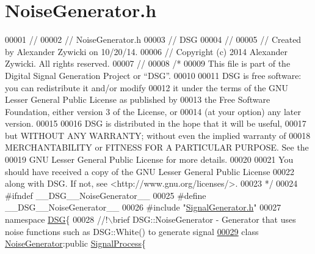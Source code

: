 \hypertarget{_noise_generator_8h_source}{\section{Noise\+Generator.\+h}
\label{_noise_generator_8h_source}
}

\begin{DoxyCode}
00001 \textcolor{comment}{//}
00002 \textcolor{comment}{//  NoiseGenerator.h}
00003 \textcolor{comment}{//  DSG}
00004 \textcolor{comment}{//}
00005 \textcolor{comment}{//  Created by Alexander Zywicki on 10/20/14.}
00006 \textcolor{comment}{//  Copyright (c) 2014 Alexander Zywicki. All rights reserved.}
00007 \textcolor{comment}{//}
00008 \textcolor{comment}{/*}
00009 \textcolor{comment}{ This file is part of the Digital Signal Generation Project or “DSG”.}
00010 \textcolor{comment}{}
00011 \textcolor{comment}{ DSG is free software: you can redistribute it and/or modify}
00012 \textcolor{comment}{ it under the terms of the GNU Lesser General Public License as published by}
00013 \textcolor{comment}{ the Free Software Foundation, either version 3 of the License, or}
00014 \textcolor{comment}{ (at your option) any later version.}
00015 \textcolor{comment}{}
00016 \textcolor{comment}{ DSG is distributed in the hope that it will be useful,}
00017 \textcolor{comment}{ but WITHOUT ANY WARRANTY; without even the implied warranty of}
00018 \textcolor{comment}{ MERCHANTABILITY or FITNESS FOR A PARTICULAR PURPOSE.  See the}
00019 \textcolor{comment}{ GNU Lesser General Public License for more details.}
00020 \textcolor{comment}{}
00021 \textcolor{comment}{ You should have received a copy of the GNU Lesser General Public License}
00022 \textcolor{comment}{ along with DSG.  If not, see <http://www.gnu.org/licenses/>.}
00023 \textcolor{comment}{ */}
00024 \textcolor{preprocessor}{#ifndef \_\_DSG\_\_NoiseGenerator\_\_}
00025 \textcolor{preprocessor}{#define \_\_DSG\_\_NoiseGenerator\_\_}
00026 \textcolor{preprocessor}{#include "\hyperlink{_signal_generator_8h}{SignalGenerator.h}"}
00027 \textcolor{keyword}{namespace }\hyperlink{namespace_d_s_g}{DSG}\{\textcolor{comment}{}
00028 \textcolor{comment}{    //!\(\backslash\)brief DSG::NoiseGenerator - Generator that uses noise functions such as DSG::White() to generate
       signal}
\hypertarget{_noise_generator_8h_source_l00029}{}\hyperlink{class_d_s_g_1_1_noise_generator}{00029} \textcolor{comment}{}    \textcolor{keyword}{class }\hyperlink{class_d_s_g_1_1_noise_generator}{NoiseGenerator}:\textcolor{keyword}{public} \hyperlink{class_d_s_g_1_1_signal_process}{SignalProcess}\{

\end{DoxyCode}
